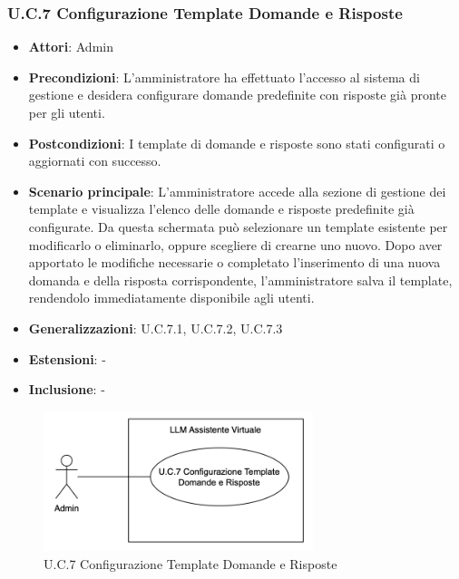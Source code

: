 \subsubsection{U.C.7 Configurazione Template Domande e Risposte}
\begin{itemize}
    \item \textbf{Attori}: Admin
    \item \textbf{Precondizioni}: L'amministratore ha effettuato l'accesso al sistema di gestione e desidera configurare domande predefinite con risposte già pronte per gli utenti.
    \item \textbf{Postcondizioni}: I template di domande e risposte sono stati configurati o aggiornati con successo.
    \item \textbf{Scenario principale}: L'amministratore accede alla sezione di gestione dei template e visualizza l'elenco delle domande e risposte predefinite già configurate. Da questa schermata può selezionare un template esistente per modificarlo o eliminarlo, oppure scegliere di crearne uno nuovo. Dopo aver apportato le modifiche necessarie o completato l'inserimento di una nuova domanda e della risposta corrispondente, l'amministratore salva il template, rendendolo immediatamente disponibile agli utenti.
    \item \textbf{Generalizzazioni}: U.C.7.1, U.C.7.2, U.C.7.3
    \item \textbf{Estensioni}: -
    \item \textbf{Inclusione}: -
\end{itemize}
\begin{figure}[H]
    \centering
    \includegraphics[width=0.7\textwidth]{img/UC7.png}
    \caption{U.C.7 Configurazione Template Domande e Risposte}
\end{figure}
\newpage

